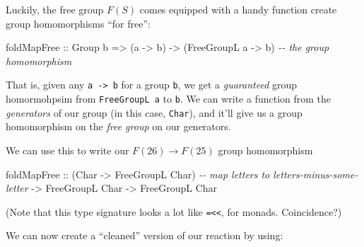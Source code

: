 \documentclass[]{article}
\newenvironment{Shaded}{}{}
\newcommand{\CommentTok}[1]{\textcolor[rgb]{0.38,0.63,0.69}{\textit{#1}}}
\newcommand{\DataTypeTok}[1]{\textcolor[rgb]{0.56,0.13,0.00}{#1}}
\newcommand{\FunctionTok}[1]{\textcolor[rgb]{0.02,0.16,0.49}{#1}}
\newcommand{\KeywordTok}[1]{\textcolor[rgb]{0.00,0.44,0.13}{\textbf{#1}}}
\newcommand{\NormalTok}[1]{#1}
\newcommand{\OperatorTok}[1]{\textcolor[rgb]{0.40,0.40,0.40}{#1}}
\newcommand{\OtherTok}[1]{\textcolor[rgb]{0.00,0.44,0.13}{#1}}
\begin{document}
Luckily, the free group \(F(S)\) comes equipped with a handy function create
group homomorphisms ``for free'':

\begin{Shaded}
\begin{Highlighting}[]
\NormalTok{foldMapFree}
\OtherTok{    ::} \DataTypeTok{Group}\NormalTok{ b}
    \OtherTok{=\textgreater{}}\NormalTok{ (a }\OtherTok{{-}\textgreater{}}\NormalTok{ b)}
    \OtherTok{{-}\textgreater{}}\NormalTok{ (}\DataTypeTok{FreeGroupL}\NormalTok{ a }\OtherTok{{-}\textgreater{}}\NormalTok{ b)     }\CommentTok{{-}{-} the group homomorphism}
\end{Highlighting}
\end{Shaded}

That is, given any \texttt{a\ -\textgreater{}\ b} for a group \texttt{b}, we get
a \emph{guaranteed} group homormohpsim from \texttt{FreeGroupL\ a} to
\texttt{b}. We can write a function from the \emph{generators} of our group (in
this case, \texttt{Char}), and it'll give us a group homomorphism on the
\emph{free group} on our generators.

We can use this to write our \(F(26) \rightarrow F(25)\) group homomorphism

\begin{Shaded}
\begin{Highlighting}[]
\NormalTok{foldMapFree}
\OtherTok{    ::}\NormalTok{ (}\DataTypeTok{Char} \OtherTok{{-}\textgreater{}} \DataTypeTok{FreeGroupL} \DataTypeTok{Char}\NormalTok{)  }\CommentTok{{-}{-} map letters to letters{-}minus{-}some{-}letter}
    \OtherTok{{-}\textgreater{}} \DataTypeTok{FreeGroupL} \DataTypeTok{Char}
    \OtherTok{{-}\textgreater{}} \DataTypeTok{FreeGroupL} \DataTypeTok{Char}
\end{Highlighting}
\end{Shaded}

(Note that this type signature looks a lot like
\texttt{=\textless{}\textless{}}, for monads. Coincidence?)

We can now create a ``cleaned'' version of our reaction by using:

\begin{Shaded}
\end{Shaded}
\end{document}
